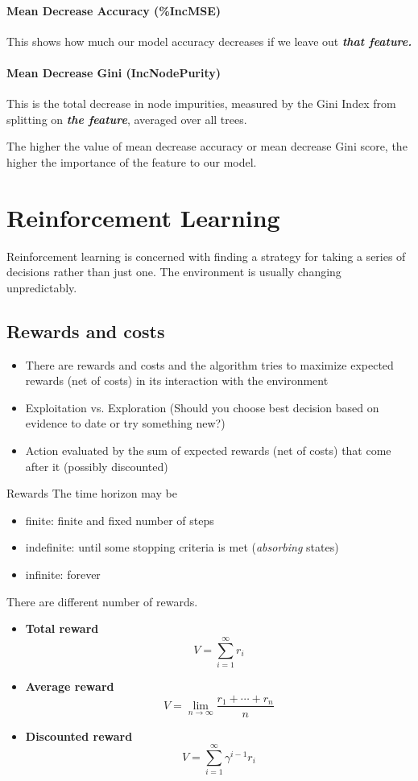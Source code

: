 \paragraph{Mean Decrease Accuracy (\%IncMSE)}
This shows how much our model accuracy decreases if we leave out \textit{\textbf{that feature.}}

\paragraph{Mean Decrease Gini (IncNodePurity)}
This is the total decrease in node impurities, measured by the Gini Index from splitting on \textit{\textbf{the feature}}, averaged over all trees.

The higher the value of mean decrease accuracy or mean decrease Gini score, the higher the importance of the feature to our model.

\section{Reinforcement Learning}

Reinforcement learning is concerned with finding a strategy for taking a series of decisions rather than just one.
The environment is usually changing unpredictably.

\subsection{Rewards and costs}

\begin{itemize}
    \item There are rewards and costs and the algorithm tries to maximize expected rewards (net of costs) in its interaction with the environment 
    \item Exploitation vs. Exploration (Should you choose best decision based on evidence to date or try something new?)
    \item Action evaluated by the sum of expected rewards (net of costs) that come after it (possibly discounted)
\end{itemize}

Rewards The time horizon may be
\begin{itemize}
    \item finite: finite and fixed number of steps
    \item indefinite: until some stopping criteria is met (\emph{absorbing} states)
    \item infinite: forever
\end{itemize}
There are different number of rewards.
\begin{itemize}
    \item \textbf{Total reward}
    \[
        V = \sum_{i=1}^{\infty} r_{i} 
    \]
    \item \textbf{Average reward}
    \[
        V = \lim_{n \to \infty} \frac{r_{1} + \cdots + r_{n}}{n}
    \]
    \item \textbf{Discounted reward}
    \[
        V = \sum_{i=1}^{\infty} \gamma ^{i-1} r_{i}  
    \]
\end{itemize}

